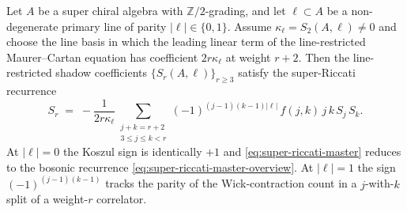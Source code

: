 \begin{theorem}
\label{thm:super-riccati-master-recurrence}
Let $A$ be a super chiral algebra with $\mathbb{Z}/2$-grading, and let
$\ell \subset A$ be a non-degenerate primary line of parity
$|\ell| \in \{0, 1\}$. Assume $\kappa_\ell = S_2(A, \ell) \ne 0$ and
choose the line basis in which the leading linear term of the
line-restricted Maurer--Cartan equation has coefficient
$2r\kappa_\ell$ at weight $r+2$. Then the line-restricted shadow
coefficients $\{S_r(A, \ell)\}_{r \ge 3}$ satisfy the super-Riccati
recurrence
\begin{equation}
\label{eq:super-riccati-master}
S_r \;=\; -\frac{1}{2 r \kappa_\ell}
\sum_{\substack{j + k = r + 2 \\ 3 \le j \le k < r}}
(-1)^{(j - 1)(k - 1) |\ell|} \, f(j, k) \, j\,k\, S_j\, S_k.
\end{equation}
At $|\ell| = 0$ the Koszul sign is identically $+1$ and
\eqref{eq:super-riccati-master} reduces to the bosonic recurrence
\eqref{eq:super-riccati-master-overview}. At $|\ell| = 1$ the sign
$(-1)^{(j-1)(k-1)}$ tracks the parity of the Wick-contraction count
in a $j$-with-$k$ split of a weight-$r$ correlator.
\end{theorem}


